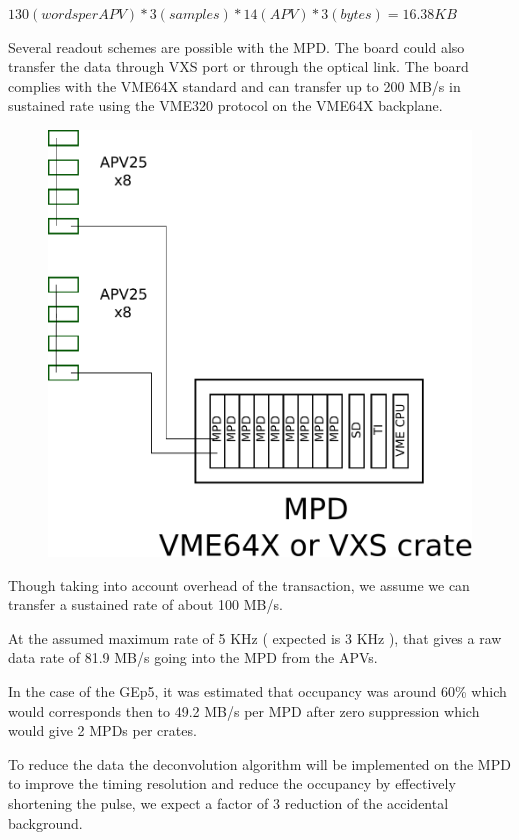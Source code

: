 \documentclass{article}
\begin{document}
$130 ( words per APV ) * 3 (samples ) * 14 (APV ) * 3 (bytes ) = 16.38 KB $

Several readout schemes are possible with the MPD.  The board could also transfer the data through VXS port or through the optical link. The board complies with the VME64X standard and can transfer up to 200 MB/s in sustained rate using the VME320 protocol on the VME64X backplane. 

\begin{figure}
\includegraphics[scale=0.55]{figs/OldMPD.pdf}\\
\end{figure}
Though taking into account overhead of the transaction, we assume we can transfer a sustained rate of about 100 MB/s.

At the assumed maximum rate of 5 KHz ( expected is 3 KHz ), that gives a raw data rate of 81.9 MB/s going into the MPD from the APVs.


In the case of the GEp5, it was estimated that occupancy was around 60\% which would corresponds then to 49.2 MB/s per MPD after zero suppression which would give 2 MPDs per crates. 

To reduce the data the deconvolution algorithm will be implemented on the MPD to improve the timing resolution and reduce the occupancy by effectively shortening the pulse, we expect a factor of 3 reduction of the accidental background.
\end{document}
